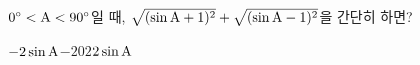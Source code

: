 $0^\circ<\mathrm{A}<90^\circ$일 때, $\sqrt{(\sin\mathrm{A}+1)^2}+\sqrt{(\sin\mathrm{A}-1)^2}$을 간단히 하면?
\begin{choices32}{$-2\sin\mathrm{A}$}{$-2$}{$0$}{$2$}{$2\sin\mathrm{A}$}\end{choices32}
